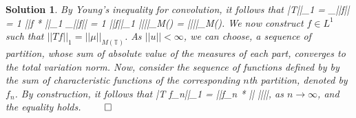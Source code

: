 \documentclass{article} %
\def\eQb#1\eQe{\begin{eqnarray*}#1\end{eqnarray*}}
\theoremstyle{quest}
\newtheorem*{solution}{Solution}
\begin{document}
\begin{solution}
\smallskip

By Young's inequality for convolution, it follows that
\eQb
||T||_{1} = \sup_{||f|| = 1} ||f * \mu||_{1} \leq \sup_{||f|| = 1 } ||f||_{1} ||\mu||_{M()}
= ||\mu||_{M()}.
\eQe
We now construct $f \in L^1$ such that $||Tf||_{1} = ||\mu||_{M(\mathbb{T})}$. As $||u|| < \infty$,
we can choose, a sequence of partition, whose sum of absolute value of the measures of each part, converges
to the total variation norm. Now, consider the sequence of functions defined by by the sum of characteristic
functions of the corresponding $n$th partition, denoted by $f_n$. By construction, it follows that
\eQb
||T f_n||_1 = ||f_n * \mu|| \to ||\mu||,
\eQe
as $n \to \infty$, and the equality holds. \hfill $\qed$

\end{solution}

\bigskip
\end{document}

